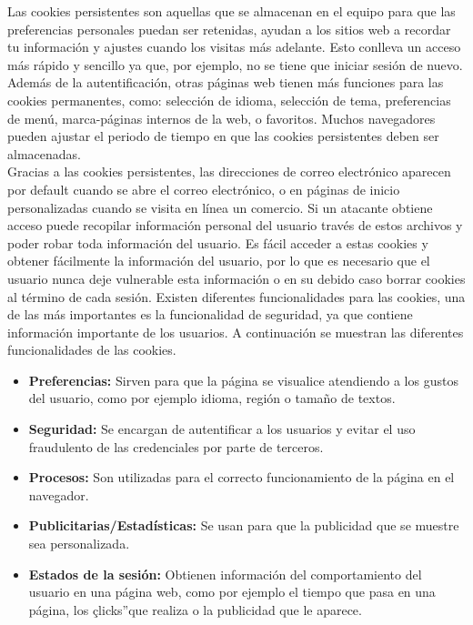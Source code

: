 \documentclass[12pt, a4paper, titlepage]{article}
\begin{document}
		Las cookies persistentes son aquellas que se almacenan en el equipo para que las preferencias personales puedan ser retenidas, ayudan a los sitios web a recordar tu información y ajustes cuando los visitas más adelante. Esto conlleva un acceso más rápido y sencillo ya que, por ejemplo, no se tiene que iniciar sesión de nuevo. Además de la autentificación, otras páginas web tienen más funciones para las cookies permanentes, como: selección de idioma, selección de tema, preferencias de menú, marca-páginas internos de la web, o favoritos. \cite{refCookiesPersistentes}
		Muchos navegadores pueden ajustar el periodo de tiempo en que las cookies persistentes deben ser almacenadas. \\
		Gracias a las cookies persistentes, las direcciones de correo electrónico aparecen por default cuando se abre el correo electrónico, o en páginas de inicio personalizadas cuando se visita en línea un comercio. Si un atacante obtiene acceso puede recopilar información personal del usuario través de estos archivos y poder robar toda información del usuario. Es fácil acceder a estas cookies y obtener fácilmente la información del usuario, por lo que es necesario que el usuario nunca deje vulnerable esta información o en su debido caso borrar cookies al término de cada sesión.
		Existen diferentes funcionalidades para las cookies, una de las más importantes es la funcionalidad de seguridad, ya que contiene información importante de los usuarios. A continuación se muestran las diferentes funcionalidades de las cookies.
		
		\begin{itemize}
		    \item \textbf{Preferencias:} Sirven para que la página se visualice atendiendo a los gustos del usuario, como por ejemplo idioma, región o tamaño de textos.
		    \item \textbf{Seguridad:} Se encargan de autentificar a los usuarios y evitar el uso fraudulento de las credenciales por parte de terceros.
		    \item \textbf{Procesos:} Son utilizadas para el correcto funcionamiento de la página en el navegador.
		    \item \textbf{Publicitarias/Estadísticas:} Se usan para que la publicidad que se muestre sea personalizada.
		    \item \textbf{Estados de la sesión:} Obtienen información del comportamiento del usuario en una página web, como por ejemplo el tiempo que pasa en una página, los çlicks”que realiza o la publicidad que le aparece.
		\end{itemize}
		
\end{document}
